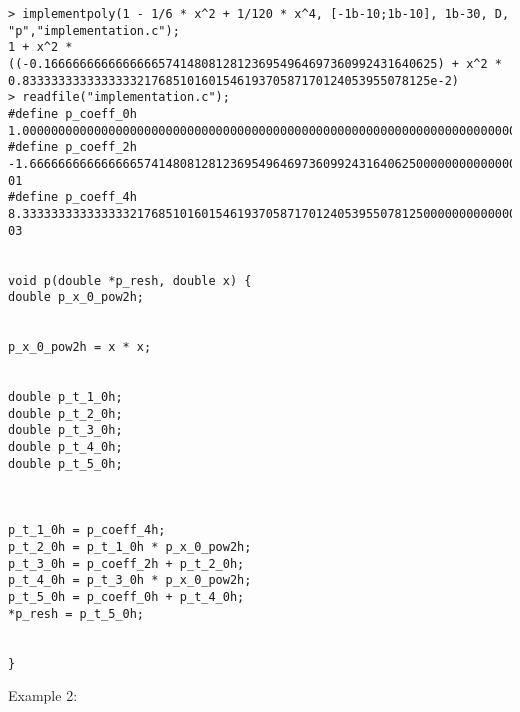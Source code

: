 \begin{center}\begin{minipage}{14.8cm}\begin{Verbatim}[frame=single]
> implementpoly(1 - 1/6 * x^2 + 1/120 * x^4, [-1b-10;1b-10], 1b-30, D, "p","implementation.c");
1 + x^2 * ((-0.1666666666666666574148081281236954964697360992431640625) + x^2 * 0.833333333333333321768510160154619370587170124053955078125e-2)
> readfile("implementation.c");
#define p_coeff_0h 1.00000000000000000000000000000000000000000000000000000000000000000000000000000000e+00
#define p_coeff_2h -1.66666666666666657414808128123695496469736099243164062500000000000000000000000000e-01
#define p_coeff_4h 8.33333333333333321768510160154619370587170124053955078125000000000000000000000000e-03


void p(double *p_resh, double x) {
double p_x_0_pow2h;


p_x_0_pow2h = x * x;


double p_t_1_0h;
double p_t_2_0h;
double p_t_3_0h;
double p_t_4_0h;
double p_t_5_0h;
 


p_t_1_0h = p_coeff_4h;
p_t_2_0h = p_t_1_0h * p_x_0_pow2h;
p_t_3_0h = p_coeff_2h + p_t_2_0h;
p_t_4_0h = p_t_3_0h * p_x_0_pow2h;
p_t_5_0h = p_coeff_0h + p_t_4_0h;
*p_resh = p_t_5_0h;


}

\end{Verbatim}
\end{minipage}\end{center}
\noindent Example 2: 
